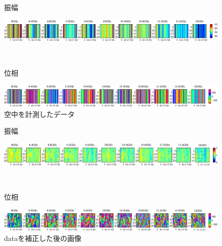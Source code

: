 ﻿\documentclass[a4j, 10pt]{jarticle}
\begin{document}
\begin{figure}[hbtp]
 \begin{center}
     \begin{minipage}[c]{0.1\hsize}
振幅
  \end{minipage}
     \begin{minipage}[c]{0.79\hsize}
\includegraphics[width = \hsize ]{20150206_direct2_raw_a.eps}
  \end{minipage}
\\
     \begin{minipage}[c]{0.1\hsize}
位相
  \end{minipage}
     \begin{minipage}[c]{0.8\hsize}
\includegraphics[width =\hsize ]{20150206_direct2_raw_p.eps}
  \end{minipage}
\caption{空中を計測したデータ}
\label{direct-raw}
 \end{center}
\end{figure}
\begin{figure}[hbtp]
 \begin{center}
     \begin{minipage}[c]{0.1\hsize}
振幅
  \end{minipage}
     \begin{minipage}[c]{0.79\hsize}
\includegraphics[width = \hsize ]{20150204_mine6_Bhosei_a.eps}
  \end{minipage}
\\
     \begin{minipage}[c]{0.1\hsize}
位相
  \end{minipage}
     \begin{minipage}[c]{0.8\hsize}
\includegraphics[width =\hsize ]{20150204_mine6_Bhosei_p.eps}
  \end{minipage}
\caption{dataを補正した後の画像}
\label{mine6-hosei}
 \end{center}
\end{figure}
\end{document}

